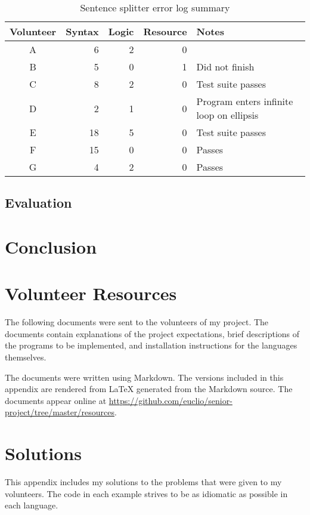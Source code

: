 \documentclass[finalcopy]{srpaper}
\begin{document}
\begin{table}[h]
\centering
\begin{tabular}{crrrl}
\toprule
Volunteer & Syntax & Logic & Resource & Notes \\
\midrule
A & 6 & 2 & 0 & \\
B & 5 & 0 & 1 & Did not finish \\
C & 8 & 2 & 0 & Test suite passes \\
D & 2 & 1 & 0 & Program enters infinite loop on ellipsis \\
E & 18 & 5 & 0 & Test suite passes \\
F & 15 & 0 & 0 & Passes \\
G & 4 & 2 & 0 & Passes \\
\bottomrule
\end{tabular}
\caption{Sentence splitter error log summary}
\label{tab:sentencesplitter}
\end{table}

\section{Evaluation}

\chapter{Conclusion}

\nocite{*}


\appendix
\chapter{Volunteer Resources}\label{app:resources}
The following documents were sent to the volunteers of my project. The
documents contain explanations of the project expectations, brief descriptions
of the programs to be implemented, and installation instructions for the
languages themselves.

The documents were written using Markdown. The versions included in this
appendix are rendered from \LaTeX{} generated from the Markdown source. The
documents appear online at
\url{https://github.com/euclio/senior-project/tree/master/resources}.

\clearpage

\clearpage

\clearpage


\chapter{Solutions}\label{app:solutions}
This appendix includes my solutions to the problems that were given to my
volunteers. The code in each example strives to be as idiomatic as possible in
each language.
\end{document}
